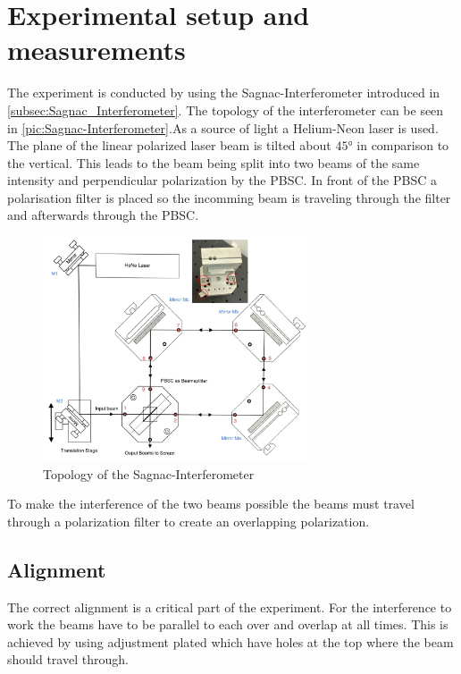 \section{Experimental setup and measurements}
\label{sec:Experimentale}
The experiment is conducted by using the Sagnac-Interferometer introduced in \ref{subsec:Sagnac_Interferometer}. 
The topology of the interferometer can be seen in \autoref{pic:Sagnac-Interferometer}.As a 
source of light a Helium-Neon laser is used. The plane of the linear polarized laser beam is tilted about $45°$ in comparison to 
the vertical. This leads to the beam being split into two beams of the same intensity and perpendicular polarization by the PBSC.
In front of the PBSC a polarisation filter is placed so the incomming beam is traveling through the filter and afterwards through the 
PBSC. 

\begin{figure}
    \centering
    \includegraphics[width=0.70\textwidth]{content/Bilder/Sagnac_Interferometer.jpeg}
    \caption{Topology of the Sagnac-Interferometer}
    \label{pic:Sagnac-Interferometer}
  \end{figure}

To make the interference of the two beams possible the beams must travel through a polarization filter to create an overlapping polarization. 

\subsection{Alignment}
The correct alignment is a critical part of the experiment. For the interference to work the beams have to be parallel to each over and 
overlap at all times. This is achieved by using adjustment plated which have holes at the top where the beam should travel through. 
